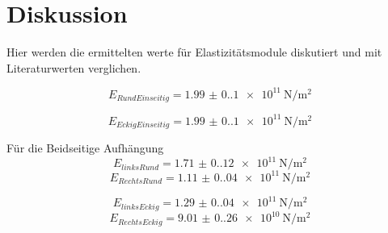 \section{Diskussion}
\label{sec:Diskussion}
Hier werden die ermittelten werte für Elastizitätsmodule diskutiert und mit Literaturwerten verglichen.

\begin{equation*}
    E_{RundEinseitig} = \qty{1.99(0.1)e11}{\newton\per\meter\squared}
  \end{equation*}

\begin{equation*}
    E_{EckigEinseitig} = \qty{1.99(0.1)e11}{\newton\per\meter\squared}
\end{equation*}

Für die Beidseitige Aufhängung
\begin{equation*}
    E_{linksRund} = \qty{1.71(0.12)e11}{\newton\per\meter\squared}
  \end{equation*}
\begin{equation*}
    E_{RechtsRund} = \qty{1.11(0.04)e11}{\newton\per\meter\squared}
\end{equation*}

\begin{equation*}
    E_{linksEckig} = \qty{1.29(0.04)e11}{\newton\per\meter\squared}
\end{equation*}
\begin{equation*}
    E_{RechtsEckig} = \qty{9.01(0.26)e10}{\newton\per\meter\squared}
\end{equation*}